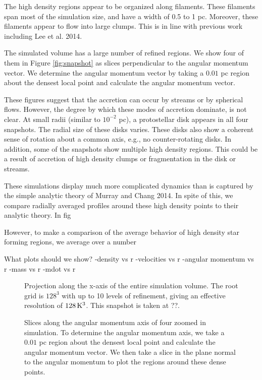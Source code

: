 \documentclass{emulateapj}
\begin{document}
The high density regions appear to be organized along filaments.  These filaments span most of the simulation size, and have a width of 0.5 to 1 pc.  Moreover, these filaments appear to flow into large clumps.  This is in line with previous work including Lee et al. 2014.  

The simulated volume has a large number of refined regions.  We show four of them in Figure \ref{fig:snapshot} as slices perpendicular to the angular momentum vector.  We determine the angular momentum vector by taking a $0.01$ pc region about the densest local point and calculate the angular momentum vector.  

These figures suggest that the accretion can occur by streams or by spherical flows.  However, the degree by which these modes of accretion dominate, is not clear.  At small radii (similar to $10^{-2}$ pc), a protostellar disk appears in all four snapshots. The radial size of these disks varies. These disks also show a coherent sense of rotation about a common axis, e.g., no counter-rotating disks. In addition, some of the snapshots show multiple high density regions.  This could be a result of accretion of high density clumps or fragmentation in the disk or streams.   

These simulations display much more complicated dynamics than is captured by the simple analytic theory of Murray and Chang 2014.  In spite of this, we compare radially averaged profiles around these high density points to their analytic theory.  In fig

However, to make a comparison of the average behavior of high density star forming regions, we average over a number 

What plots should we show?
-density vs r
-velocities vs r
-angular momentum vs r
-mass vs r
-mdot vs r

\begin{figure}
\caption{Projection along the x-axis of the entire simulation volume. The root grid is $128^3$ with up to 10 levels of refinement, giving an effective resolution of $128\,{\rm K}^3$. This snapshot is taken at ??. \label{fig:entire projection}}
\end{figure}

\begin{figure*}
\caption{Slices along the angular momentum axis of four zoomed in simulation. To determine the angular momentum axis, we take a $0.01$ pc region about the densest local point and calculate the angular momentum vector. We then take a slice in the plane normal to the angular momentum to plot the regions around these dense points. \label{fig:snapshots}}
\end{figure*}
\end{document}
